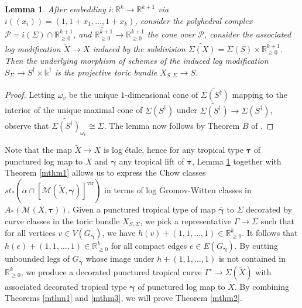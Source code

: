 \documentclass[12pt, oneside]{amsart}   	%
\newcounter{thm}
\newtheorem{lemma}[thm]{Lemma}
\newcommand{\kk}{\mathds{k}}
\newcommand{\vir}{\operatorname{vir}}
\numberwithin{equation}{section}
\numberwithin{thm}{section}
\numberwithin{figure}{section}
\begin{document}

\begin{lemma}\label{tbund}
After embedding $i:\mathbb{R}^k \rightarrow \mathbb{R}^{k+1}$ via $i((x_i)) = (1,1+x_1,\ldots,1+x_k)$, consider the polyhedral complex $\mathcal{P} = i(\Sigma)\cap\mathbb{R}_{\ge 0}^{k+1}$, and $\widetilde{\mathbb{R}_{\ge 0}^{k+1}} \rightarrow \mathbb{R}_{\ge 0}^{k+1}$ the cone over $\mathcal{P}$, consider the associated log modification $\widetilde{X} \rightarrow X$ induced by the subdivision $\widetilde{\Sigma(X)} = \Sigma(S) \times \widetilde{\mathbb{R}_{\ge 0}^{k+1}}$. Then the underlying morphism of schemes of the induced log modification $S_{\Sigma} \rightarrow S^\dagger \times \kk^{\dagger}$ is the projective toric bundle $X_{S,\Sigma} \rightarrow S$.
\end{lemma}

\begin{proof}
Letting $\omega_v$ be the unique $1$-dimensional cone of $\widetilde{\Sigma(S^{\dagger})}$ mapping to the interior of the unique maximal cone of $\Sigma(S^{\dagger})$ under $\widetilde{\Sigma(S^{\dagger})}  \rightarrow \Sigma(S^{\dagger})$, observe that $\widetilde{\Sigma(S^{\dagger})} _{\omega_v} \cong \Sigma$. The lemma now follows by Theorem $B$ of \cite{torbund}.
\end{proof}

Note that the map $\widetilde{X} \rightarrow X$ is log \'etale, hence for any tropical type $\pmb\tau$ of punctured log map to $X$ and $\pmb\gamma$ any tropical lift of $\pmb\tau$, Lemma \ref{tbund} together with Theorem \ref{mthm1} allows us to express the Chow classes $st_*(\alpha\cap[\mathscr{M}(\widetilde{X},\pmb\gamma)]^{\vir})$ in terms of log Gromov-Witten classes in $A_*(\mathscr{M}(X,\pmb\tau))$. Given a punctured tropical type of map $\overline{\pmb\gamma}$ to $\Sigma$ decorated by curve classes in the toric bundle $X_{S,\Sigma}$, we pick a representative $\Gamma \rightarrow \Sigma$ such that for all vertices $v \in V(G_{\overline{\pmb\gamma}})$, we have $h(v) + (1,1,\ldots,1) \in \mathbb{R}^k_{\ge 0}$. It follows that $h(e) + (1,1,\ldots,1) \in \mathbb{R}^k_{\ge 0}$ for all compact edges $e \in E(G_{\overline{\pmb\gamma}})$. By cutting unbounded legs of $G_{\overline{\pmb\gamma}}$ whose image under $h + (1,1,\ldots,1)$ is not contained in $\mathbb{R}^k_{\ge 0}$, we produce a decorated punctured tropical curve $\Gamma^{\circ} \rightarrow \Sigma(\widetilde{X})$ with associated decorated tropical type $\pmb\gamma$ of punctured log map to $\widetilde{X}$. By combining Theorems \ref{mthm1} and \ref{mthm3}, we will prove Theorem \ref{mthm2}.
\end{document}
